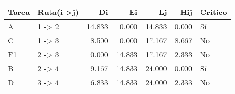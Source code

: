 \begin{tabular}{llrrrrl}
\toprule
Tarea & Ruta(i->j) & Di & Ei & Lj & Hij & Critico \\
\midrule
A & 1 -> 2 & 14.833 & 0.000 & 14.833 & 0.000 & Sí \\
C & 1 -> 3 & 8.500 & 0.000 & 17.167 & 8.667 & No \\
F1 & 2 -> 3 & 0.000 & 14.833 & 17.167 & 2.333 & No \\
B & 2 -> 4 & 9.167 & 14.833 & 24.000 & 0.000 & Sí \\
D & 3 -> 4 & 6.833 & 14.833 & 24.000 & 2.333 & No \\
\bottomrule
\end{tabular}
